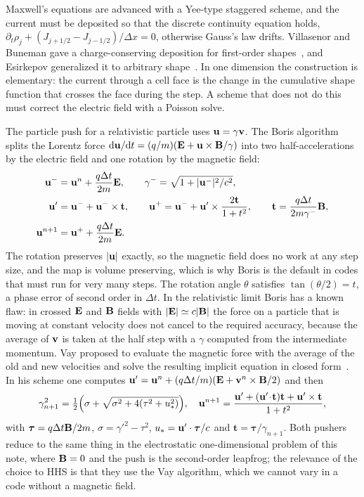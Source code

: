 Maxwell's equations are advanced with a Yee-type staggered scheme, and the current must be deposited so that the discrete continuity equation holds, $\partial_t\rho_j+(J_{j+1/2}-J_{j-1/2})/\Delta x=0$, otherwise Gauss's law drifts. Villasenor and Buneman gave a charge-conserving deposition for first-order shapes~\citep{VillasenorBuneman1992}, and Esirkepov generalized it to arbitrary shape~\citep{Esirkepov2001}. In one dimension the construction is elementary: the current through a cell face is the change in the cumulative shape function that crosses the face during the step. A scheme that does not do this must correct the electric field with a Poisson solve.

The particle push for a relativistic particle uses $\mathbf u=\gamma\mathbf v$. The Boris algorithm~\citep{Boris1970} splits the Lorentz force $\mathrm{d}\mathbf u/\mathrm{d} t=(q/m)(\mathbf E+\mathbf u\times\mathbf B/\gamma)$ into two half-accelerations by the electric field and one rotation by the magnetic field:
\begin{align}
\mathbf u^-&=\mathbf u^{n}+\frac{q\Delta t}{2m}\mathbf E ,\qquad \gamma^-=\sqrt{1+|\mathbf u^-|^2/c^2},\\
\mathbf u'&=\mathbf u^-+\mathbf u^-\times\mathbf t ,\qquad \mathbf u^+=\mathbf u^-+\mathbf u'\times\frac{2\mathbf t}{1+t^2} ,\qquad\mathbf t=\frac{q\Delta t}{2m\gamma^-}\mathbf B ,\\
\mathbf u^{n+1}&=\mathbf u^++\frac{q\Delta t}{2m}\mathbf E .
\end{align}
The rotation preserves $|\mathbf u|$ exactly, so the magnetic field does no work at any step size, and the map is volume preserving, which is why Boris is the default in codes that must run for very many steps. The rotation angle $\theta$ satisfies $\tan(\theta/2)=t$, a phase error of second order in $\Delta t$. In the relativistic limit Boris has a known flaw: in crossed $\mathbf E$ and $\mathbf B$ fields with $|\mathbf E|\simeq c|\mathbf B|$ the force on a particle that is moving at constant velocity does not cancel to the required accuracy, because the average of $\mathbf v$ is taken at the half step with a $\gamma$ computed from the intermediate momentum. Vay proposed to evaluate the magnetic force with the average of the old and new velocities and solve the resulting implicit equation in closed form~\citep{Vay2008}. In his scheme one computes $\mathbf u'=\mathbf u^n+(q\Delta t/m)(\mathbf E+\mathbf v^n\times\mathbf B/2)$ and then
\begin{equation}
\gamma_{n+1}^2=\tfrac12\Big(\sigma+\sqrt{\sigma^2+4(\tau^2+u_*^2)}\Big),\quad
\mathbf u^{n+1}=\frac{\mathbf u'+(\mathbf u'\!\cdot\!\mathbf t)\mathbf t+\mathbf u'\times\mathbf t}{1+t^2},
\end{equation}
with $\boldsymbol\tau=q\Delta t\mathbf B/2m$, $\sigma=\gamma'^2-\tau^2$, $u_*=\mathbf u'\cdot\boldsymbol\tau/c$ and $\mathbf t=\boldsymbol\tau/\gamma_{n+1}$. Both pushers reduce to the same thing in the electrostatic one-dimensional problem of this note, where $\mathbf B=0$ and the push is the second-order leapfrog; the relevance of the choice to HHS is that they use the Vay algorithm, which we cannot vary in a code without a magnetic field.

